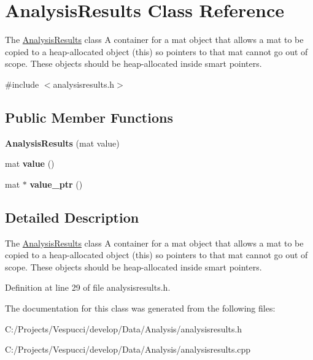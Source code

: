 \hypertarget{class_analysis_results}{\section{Analysis\+Results Class Reference}
\label{class_analysis_results}
}


The \hyperlink{class_analysis_results}{Analysis\+Results} class A container for a mat object that allows a mat to be copied to a heap-\/allocated object (this) so pointers to that mat cannot go out of scope. These objects should be heap-\/allocated inside smart pointers.  




{\ttfamily \#include $<$analysisresults.\+h$>$}

\subsection*{Public Member Functions}
\begin{DoxyCompactItemize}
\item 
\hypertarget{class_analysis_results_a96290e00cecee6d9fea02ffb42633eeb}{{\bfseries Analysis\+Results} (mat value)}\label{class_analysis_results_a96290e00cecee6d9fea02ffb42633eeb}

\item 
\hypertarget{class_analysis_results_ae591750de59fc7c4a8bcb9d422cf161d}{mat {\bfseries value} ()}\label{class_analysis_results_ae591750de59fc7c4a8bcb9d422cf161d}

\item 
\hypertarget{class_analysis_results_a1ea6245771f569a72f0cccae21798270}{mat $\ast$ {\bfseries value\+\_\+ptr} ()}\label{class_analysis_results_a1ea6245771f569a72f0cccae21798270}

\end{DoxyCompactItemize}


\subsection{Detailed Description}
The \hyperlink{class_analysis_results}{Analysis\+Results} class A container for a mat object that allows a mat to be copied to a heap-\/allocated object (this) so pointers to that mat cannot go out of scope. These objects should be heap-\/allocated inside smart pointers. 

Definition at line 29 of file analysisresults.\+h.



The documentation for this class was generated from the following files\+:\begin{DoxyCompactItemize}
\item 
C\+:/\+Projects/\+Vespucci/develop/\+Data/\+Analysis/analysisresults.\+h\item 
C\+:/\+Projects/\+Vespucci/develop/\+Data/\+Analysis/analysisresults.\+cpp\end{DoxyCompactItemize}
